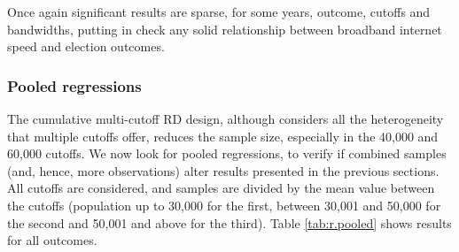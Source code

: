 \documentclass[
  12pt,
]{article}
\begin{document}
Once again significant results are sparse, for some years, outcome,
cutoffs and bandwidths, putting in check any solid relationship between
broadband internet speed and election outcomes.

\hypertarget{pooled-regressions}{%
\subsubsection{Pooled regressions}\label{pooled-regressions}}

The cumulative multi-cutoff RD design, although considers all the
heterogeneity that multiple cutoffs offer, reduces the sample size,
especially in the 40,000 and 60,000 cutoffs. We now look for pooled
regressions, to verify if combined samples (and, hence, more
observations) alter results presented in the previous sections. All
cutoffs are considered, and samples are divided by the mean value
between the cutoffs (population up to 30,000 for the first, between
30,001 and 50,000 for the second and 50,001 and above for the third).
Table \ref{tab:r.pooled} shows results for all outcomes.
\end{document}
